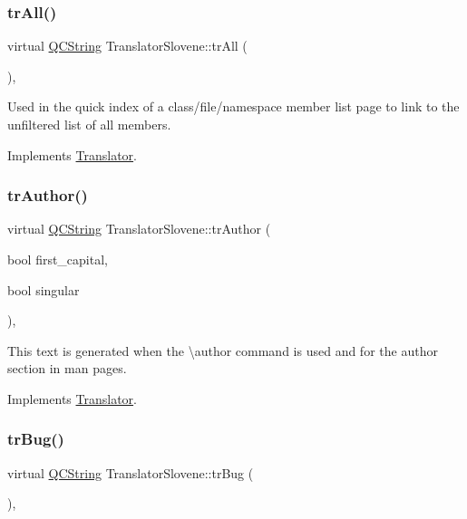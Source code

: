 \subsubsection{\texorpdfstring{trAll()}{trAll()}}
{\footnotesize\ttfamily virtual \mbox{\hyperlink{class_q_c_string}{Q\+C\+String}} Translator\+Slovene\+::tr\+All (\begin{DoxyParamCaption}{ }\end{DoxyParamCaption})\hspace{0.3cm}{\ttfamily [inline]}, {\ttfamily [virtual]}}

Used in the quick index of a class/file/namespace member list page to link to the unfiltered list of all members. 

Implements \mbox{\hyperlink{class_translator}{Translator}}.

\mbox{\label{class_translator_slovene_ac56b215affd0f9f24be416f0be413e6a}} 
\subsubsection{\texorpdfstring{trAuthor()}{trAuthor()}}
{\footnotesize\ttfamily virtual \mbox{\hyperlink{class_q_c_string}{Q\+C\+String}} Translator\+Slovene\+::tr\+Author (\begin{DoxyParamCaption}\item[{bool}]{first\+\_\+capital,  }\item[{bool}]{singular }\end{DoxyParamCaption})\hspace{0.3cm}{\ttfamily [inline]}, {\ttfamily [virtual]}}

This text is generated when the \textbackslash{}author command is used and for the author section in man pages. 

Implements \mbox{\hyperlink{class_translator}{Translator}}.

\mbox{\label{class_translator_slovene_a7a3e82e47f4326d08ee45f263274b840}} 
\subsubsection{\texorpdfstring{trBug()}{trBug()}}
{\footnotesize\ttfamily virtual \mbox{\hyperlink{class_q_c_string}{Q\+C\+String}} Translator\+Slovene\+::tr\+Bug (\begin{DoxyParamCaption}{ }\end{DoxyParamCaption})\hspace{0.3cm}{\ttfamily [inline]}, {\ttfamily [virtual]}}

